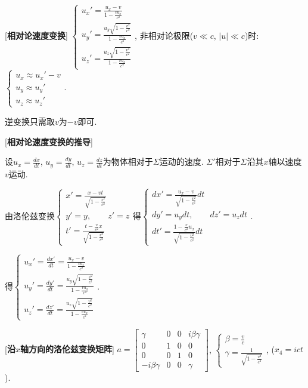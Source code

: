 [\textbf{相对论速度变换}] $\begin{cases}u_x'=\frac{u_x-v}{1-\frac{vu_x}{c^2}}\\u_y'=\frac{u_y\sqrt{1-\frac{v^2}{c^2}}}{1-\frac{vu_x}{c^2}}\\u_z'=\frac{u_z\sqrt{1-\frac{v^2}{c^2}}}{1-\frac{vu_x}{c^2}}\end{cases}$, 非相对论极限($v\ll c$, $|u|\ll c$)时: $\begin{cases}u_x\approx u_x'-v\\u_y\approx u_y'\\u_z\approx u_z'\end{cases}$.\par
\qquad 逆变换只需取$v$为$-v$即可.\par

[\textbf{相对论速度变换的推导}]\par
\qquad 设$u_x=\frac{dx}{dt}$, $u_y=\frac{dy}{dt}$, $u_z=\frac{dz}{dt}$为物体相对于$\Sigma$运动的速度. $\Sigma'$相对于$\Sigma$沿其$x$轴以速度$v$运动.\par
\qquad 由洛伦兹变换$\begin{cases}x'=\frac{x-vt}{\sqrt{1-\frac{v^2}{c^2}}}\\y'=y,\qquad z'=z\\t'=\frac{t-\frac{v}{c^2}x}{\sqrt{1-\frac{v^2}{c^2}}}\end{cases}$得$\begin{cases}dx'=\frac{u_x-v}{\sqrt{1-\frac{v^2}{c^2}}}dt\\dy'=u_ydt,\qquad dz'=u_zdt\\dt'=\frac{1-\frac{v}{c^2}u_x}{\sqrt{1-\frac{v^2}{c^2}}}dt\end{cases}$.\par
\qquad \qquad 得$\begin{cases}u_x'=\frac{dx'}{dt}=\frac{u_x-v}{1-\frac{vu_x}{c^2}}\\u_y'=\frac{dy'}{dt}=\frac{u_y\sqrt{1-\frac{v^2}{c^2}}}{1-\frac{vu_x}{c^2}}\\u_z'=\frac{dz'}{dt}=\frac{u_z\sqrt{1-\frac{v^2}{c^2}}}{1-\frac{vu_x}{c^2}}\end{cases}$.\par

[\textbf{沿$x$轴方向的洛伦兹变换矩阵}] $a=\left[\begin{matrix}\gamma&0&0&i\beta\gamma\\0&1&0&0\\0&0&1&0\\-i\beta\gamma&0&0&\gamma \end{matrix}\right]$, $\begin{cases}\beta=\frac{v}{c}\\\gamma=\frac{1}{\sqrt{1-\frac{v^2}{c^2}}}\end{cases}$, ($x_4=ict$).\par

